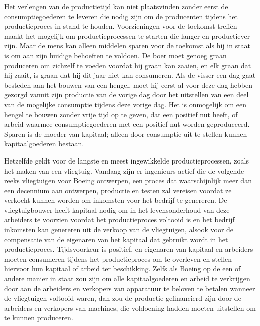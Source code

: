 \documentclass[
  a5paper,
  smalldemyvopaper,11pt,twoside,onecolumn,openright,extrafontsizes,
hidelinks]{memoir}
\begin{document}
Het verlengen van de productietijd kan niet plaatsvinden zonder eerst de
consumptiegoederen te leveren die nodig zijn om de producenten tijdens
het productieproces in stand te houden. Voorzieningen voor de toekomst
treffen maakt het mogelijk om productieprocessen te starten die langer
en productiever zijn. Maar de mens kan alleen middelen sparen voor de
toekomst als hij in staat is om aan zijn huidige behoeften te voldoen.
De boer moet genoeg graan produceren om zichzelf te voeden voordat hij
graan kan zaaien, en elk graan dat hij zaait, is graan dat hij dit jaar
niet kan consumeren. Als de visser een dag gaat besteden aan het bouwen
van een hengel, moet hij eerst al voor deze dag hebben gezorgd vanuit
zijn productie van de vorige dag door het uitstellen van een deel van de
mogelijke consumptie tijdens deze vorige dag. Het is onmogelijk om een
hengel te bouwen zonder vrije tijd op te geven, dat een positief nut
heeft, of arbeid waarmee consumptiegoederen met een positief nut worden
geproduceerd. Sparen is de moeder van kapitaal; alleen door consumptie
uit te stellen kunnen kapitaalgoederen bestaan.

Hetzelfde geldt voor de langste en meest ingewikkelde
productieprocessen, zoals het maken van een vliegtuig. Vandaag zijn er
ingenieurs actief die de volgende reeks vliegtuigen voor Boeing
ontwerpen, een proces dat waarschijnlijk meer dan een decennium aan
ontwerpen, productie en testen zal vereisen voordat ze verkocht kunnen
worden om inkomsten voor het bedrijf te genereren. De vliegtuigbouwer
heeft kapitaal nodig om in het levensonderhoud van deze arbeiders te
voorzien voordat het productieproces voltooid is en het bedrijf
inkomsten kan genereren uit de verkoop van de vliegtuigen, alsook voor
de compensatie van de eigenaren van het kapitaal dat gebruikt wordt in
het productieproces. Tijdsvoorkeur is positief, en eigenaren van
kapitaal en arbeiders moeten consumeren tijdens het productieproces om
te overleven en stellen hiervoor hun kapitaal of arbeid ter beschikking.
Zelfs als Boeing op de een of andere manier in staat zou zijn om alle
kapitaalgoederen en arbeid te verkrijgen door aan de arbeiders en
verkopers van apparatuur te beloven te betalen wanneer de vliegtuigen
voltooid waren, dan zou de productie gefinancierd zijn door de arbeiders
en verkopers van machines, die voldoening hadden moeten uitstellen om te
kunnen produceren.
\end{document}
